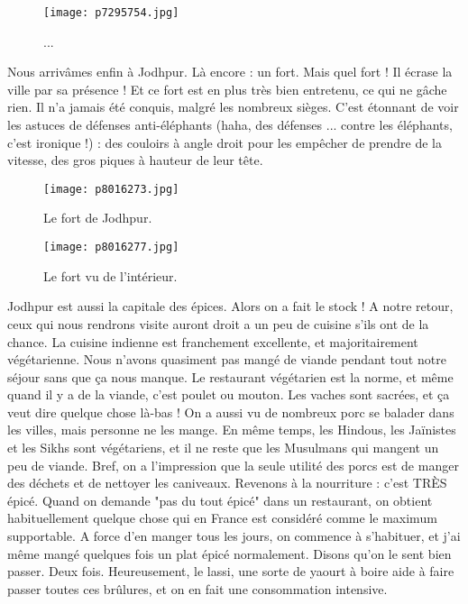 \documentclass{book}
\begin{document}
\begin{figure}[h]
\centering
\texttt{[image: p7295754.jpg]}
\caption*{...}
\end{figure}

Nous arrivâmes enfin à Jodhpur. Là encore : un fort. Mais quel fort ! Il écrase la ville par sa présence ! Et ce fort est en plus très bien entretenu, ce qui ne gâche rien. Il n'a jamais été conquis, malgré les nombreux sièges. C'est étonnant de voir les astuces de défenses anti-éléphants (haha, des défenses ... contre les éléphants, c'est ironique !) : des couloirs à angle droit pour les empêcher de prendre de la vitesse, des gros piques à hauteur de leur tête.


\begin{figure}[h]
\centering
\texttt{[image: p8016273.jpg]}
\caption*{Le fort de Jodhpur.}
\end{figure}


\begin{figure}[h]
\centering
\texttt{[image: p8016277.jpg]}
\caption*{Le fort vu de l'intérieur.}
\end{figure}

Jodhpur est aussi la capitale des épices. Alors on a fait le stock ! A notre retour, ceux qui nous rendrons visite auront droit a un peu de cuisine s'ils ont de la chance. La cuisine indienne est franchement excellente, et majoritairement végétarienne. Nous n'avons quasiment pas mangé de viande pendant tout notre séjour sans que ça nous manque. Le restaurant végétarien est la norme, et même quand il y a de la viande, c'est poulet ou mouton. Les vaches sont sacrées, et ça veut dire quelque chose là-bas ! On a aussi vu de nombreux porc se balader dans les villes, mais personne ne les mange. En même temps, les Hindous, les Jaïnistes et les Sikhs sont végétariens, et il ne reste que les Musulmans qui mangent un peu de viande. Bref, on a l'impression que la seule utilité des porcs est de manger des déchets et de nettoyer les caniveaux. Revenons à la nourriture : c'est TRÈS épicé. Quand on demande "pas du tout épicé" dans un restaurant, on obtient habituellement quelque chose qui en France est considéré comme le maximum supportable. A force d'en manger tous les jours, on commence à s'habituer, et j'ai même mangé quelques fois un plat épicé normalement. Disons qu'on le sent bien passer. Deux fois. Heureusement, le lassi, une sorte de yaourt à boire aide à faire passer toutes ces brûlures, et on en fait une consommation intensive.
\end{document}

